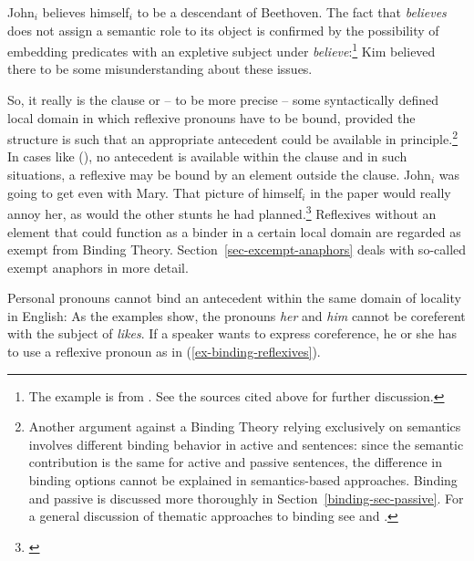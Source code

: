 \documentclass[output=paper,biblatex,babelshorthands,newtxmath,draftmode,colorlinks,citecolor=brown]{langscibook}
\begin{document}
\largerpage
\ea
John$_i$ believes himself$_i$ to be a descendant of Beethoven.
\z
The fact that \emph{believes} does not assign a semantic role to its object is confirmed by the
possibility of embedding predicates with an expletive subject under \emph{believe}:\footnote{%
The example is from \citet[]{ps2}. See the sources cited above for further discussion.
}
\ea
Kim believed there to be some misunderstanding about these issues.
\z

\noindent
So, it really is the clause or -- to be more precise -- some syntactically defined local domain in
which reflexive pronouns have to be bound, provided the structure is such that an
  appropriate antecedent could be available in principle.\footnote{%
Another argument against a Binding Theory relying exclusively on semantics involves different binding
behavior in active and  sentences: since the semantic contribution is the same for active
and passive sentences, the difference in binding options cannot be explained in semantics-based
approaches. Binding and passive is discussed more thoroughly in Section~\ref{binding-sec-passive}. 
For a general discussion of
thematic approaches to binding see  and .
}
In cases like (), no antecedent is available within the clause and in such situations, a
reflexive may be bound by an element outside the clause.
\eanoraggedright
\label{ex-stunts}
John$_i$ was going to get even with Mary. That picture of himself$_i$
in the paper would really annoy her, as would the other stunts he had planned.\footnote{
       \citet[]{ps2}
}
\z
Reflexives without an element that could function as a binder in a certain local domain are regarded
as exempt from Binding Theory. Section~\ref{sec-excempt-anaphors} deals with so-called exempt anaphors in more detail.

\largerpage
Personal pronouns cannot bind an antecedent within the same domain of locality in English:
\eal
{}
\zl
As the examples show, the pronouns \emph{her} and \emph{him} cannot be coreferent with the subject
of \emph{likes}. If a speaker wants to express coreference, he or she has to use a reflexive pronoun
as in (\ref{ex-binding-reflexives}). 
\end{document}
